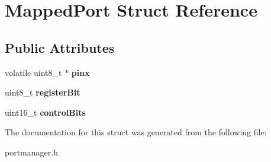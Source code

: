 \hypertarget{structMappedPort}{}\section{Mapped\+Port Struct Reference}
\label{structMappedPort}
\subsection*{Public Attributes}
\begin{DoxyCompactItemize}
\item 
\mbox{\label{structMappedPort_a504fc8fe2e91d886ed39d36a3c4e40f8}} 
volatile uint8\+\_\+t $\ast$ {\bfseries pinx}
\item 
\mbox{\label{structMappedPort_a5a906790bc9881785c9c166c8591dfc2}} 
uint8\+\_\+t {\bfseries register\+Bit}
\item 
\mbox{\label{structMappedPort_adf3e643dfa47b413740315ecf6b55e26}} 
uint16\+\_\+t {\bfseries control\+Bits}
\end{DoxyCompactItemize}


The documentation for this struct was generated from the following file\+:\begin{DoxyCompactItemize}
\item 
portmanager.\+h\end{DoxyCompactItemize}
